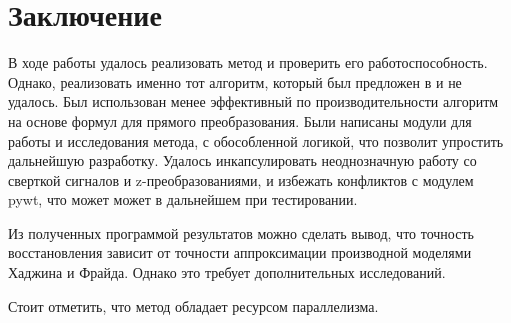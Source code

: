 \documentclass[oneside, final, 14pt]{article}
\begin{document}
\section*{Заключение}
В ходе работы удалось реализовать метод и проверить его работоспособность. Однако, реализовать именно тот алгоритм, который был предложен в \cite{new_method1} и \cite{new_method2} не удалось. Был использован менее эффективный по производительности алгоритм на основе формул для прямого преобразования. Были написаны модули для работы и исследования метода, с обособленной логикой, что позволит упростить дальнейшую разработку. Удалось инкапсулировать неоднозначную работу со сверткой сигналов и z-преобразованиями, и избежать конфликтов с модулем pywt, что может может в дальнейшем при тестировании. 

Из полученных программой результатов можно сделать вывод, что точность восстановления зависит от точности аппроксимации производной моделями Хаджина и Фрайда. Однако это требует дополнительных исследований. 

Стоит отметить, что метод обладает ресурсом параллелизма.
\newpage

\end{document}
